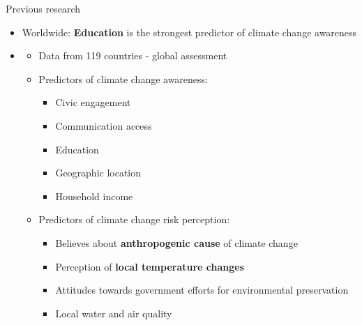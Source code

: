 \documentclass{beamer}              %
\begin{document}
\begin{frame}{Previous research}\label{Previous research}
\begin{itemize}
\item Worldwide: \textbf{Education} is the strongest predictor of climate change awareness

\item  \cite{Leiserowitz2015}


\begin{itemize}
\item{Data from 119 countries - global assessment}

\item{Predictors of climate change awareness:}
\begin{itemize}
\item Civic engagement
\item Communication access
\item Education
\item Geographic location
\item Household income
\end{itemize}

\item{Predictors of climate change risk perception:}
\begin{itemize}
\item Believes about \textbf{anthropogenic cause} of climate change
\item Perception of \textbf{local temperature changes}
\item Attitudes towards government efforts for environmental preservation 
\item Local water and air quality
\end{itemize}
\end{itemize}
\end{itemize}
\end{frame}

\end{document}

